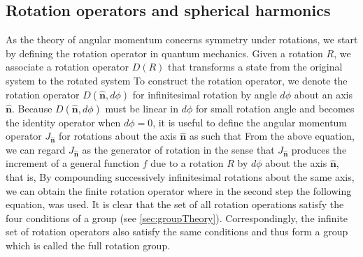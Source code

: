 \subsection{Rotation operators and spherical harmonics}

As the theory of angular
 momentum concerns  symmetry under rotations, we start by defining the rotation operator in quantum 
 mechanics. Given a rotation $R$, we associate a rotation operator 
 $D(R)$ that transforms a state from the original system to the rotated system
To construct the rotation operator, we denote the rotation operator $D(\mathbf{\hat{n}}, d\phi)$ for infinitesimal 
rotation by angle $d\phi$ about an axis $\mathbf{\hat{n}}$. Because $D(\mathbf{\hat{n}}, d\phi)$ must be linear
in $d\phi$ for small rotation angle and becomes the identity operator when $d\phi = 0$, it is useful to define the angular
 momentum operator $J_{\mathbf{\hat{n}}}$ for rotations about the axis $\mathbf{\hat{n}}$ as 
such that
From the above equation, we can regard $J_{\mathbf{\hat{n}}}$ as the generator of rotation in the sense that $ J_{\mathbf{\hat{n}}}$ produces the increment of a general function $f$ due to a rotation $R$ 
by $d\phi$ about the axis $\mathbf{\hat{n}}$, that is,
By compounding successively infinitesimal rotations about the same axis, we can obtain the finite rotation operator
where in the second step the following equation,
was used. 
It is clear that the set of all rotation operations satisfy the four conditions of a group (see 
\autoref{sec:groupTheory}). Correspondingly, 
 the infinite set of rotation operators also satisfy the same conditions and thus form a group which is called the full 
rotation group. 


